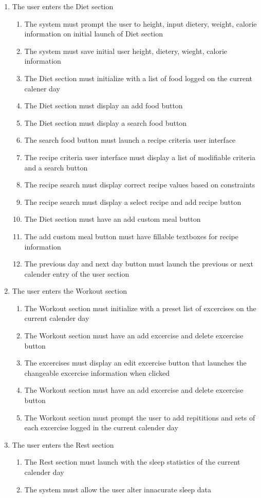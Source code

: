 \documentclass[12pt,letterpaper]{article}
\begin{document}
\begin{enumerate}[{BE}1.]
\item The user enters the Diet section
\begin{enumerate}[resume*]
	\item  The system must prompt the user to height, input dietery, weight,  calorie information on initial launch of Diet section
	\item  The system must save initial user height, dietery, wieght, calorie information
	\item  The Diet section must initialize with a list of food logged on the current calener day
	\item  The Diet section must display an add food button
	\item  The Diet section must display a search food button
	\item  The search food button must launch a recipe criteria user interface
	\item  The recipe criteria user interface must display a list of modifiable criteria and a search button
	\item  The recipe search must display correct recipe values based on constraints
	\item  The recipe search must display a select recipe and add recipe button
	\item  The Diet section must have an add custom meal button
	\item  The add custom meal button must have fillable textboxes for recipe information
	\item  The previous day and next day button must launch the previous or next calender entry of the user section
\end{enumerate}

\item The user enters the Workout section
\begin{enumerate}[resume*]
	\item  The Workout section must initialize with a preset list of excercises on the current calender day
	\item  The Workout section must have an add excercise and delete excercise button
	\item  The excercises must display an edit excercise button that launches the changeable excercise information when clicked
	\item  The Workout section must have an add excercise and delete excercise button
	\item  The Workout section must prompt the user to add repititions and sets of each excercise logged in the current calender day
\end{enumerate}

\item The user enters the Rest section
\begin{enumerate}[resume*]
	\item  The Rest section must launch with the sleep statistics of the current calender day
	\item  The system must allow the user alter innacurate sleep data
\end{enumerate}
\end{enumerate}
\end{document}
